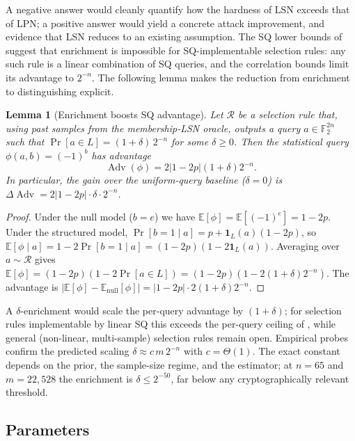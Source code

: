 \documentclass[11pt,a4paper]{article}
\theoremstyle{plain}
\newtheorem{lemma}[theorem]{Lemma}
\theoremstyle{definition}
\newcommand{\F}{\mathbb{F}}
\newcommand{\E}{\mathbb{E}}
\begin{document}
A negative answer would cleanly quantify how the hardness of LSN exceeds that of LPN; a positive answer would yield a concrete attack improvement, and evidence that LSN reduces to an existing assumption.  The SQ lower bounds of  suggest that enrichment is impossible for SQ-implementable selection rules: any such rule is a linear combination of SQ queries, and the correlation bounds limit its advantage to $2^{-n}$. The following lemma makes the reduction from enrichment to distinguishing explicit.

\begin{lemma}[Enrichment boosts SQ advantage]
\label{lem:enrichment-sq}
Let $\mathcal{R}$ be a selection rule that, using past samples from the membership-LSN oracle, outputs a query $a \in \F_2^{2n}$ such that $\Pr[a \in L] = (1+\delta)\,2^{-n}$ for some $\delta \ge 0$. Then the statistical query $\phi(a,b) = (-1)^b$ has advantage
\[
  \operatorname{Adv}(\phi) = 2|1-2p|(1+\delta)2^{-n}.
\]
In particular, the gain over the uniform-query baseline ($\delta=0$) is $\Delta\operatorname{Adv} = 2|1-2p|\cdot\delta\cdot 2^{-n}$.
\end{lemma}

\begin{proof}
Under the null model ($b=e$) we have $\E[\phi] = \E[(-1)^e] = 1-2p$. Under the structured model, $\Pr[b=1 \mid a] = p + \mathbf{1}_L(a)(1-2p)$, so $\E[\phi \mid a] = 1-2\Pr[b=1 \mid a] = (1-2p)(1-2\mathbf{1}_L(a))$. Averaging over $a \sim \mathcal{R}$ gives $\E[\phi] = (1-2p)(1-2\Pr[a \in L]) = (1-2p)(1-2(1+\delta)2^{-n})$. The advantage is $|\E[\phi]-\E_{\text{null}}[\phi]| = |1-2p| \cdot 2(1+\delta)2^{-n}$.
\end{proof}

A $\delta$-enrichment would scale the per-query advantage by $(1+\delta)$; for selection rules implementable by linear SQ this exceeds the per-query ceiling of , while general (non-linear, multi-sample) selection rules remain open.  Empirical probes confirm the predicted scaling $\delta \approx c\,m\,2^{-n}$ with $c=\Theta(1)$.  The exact constant depends on the prior, the sample-size regime, and the estimator; at $n=65$ and $m=22{,}528$ the enrichment is $\delta \le 2^{-50}$, far below any cryptographically relevant threshold.

\subsection{Parameters}
\label{subsec:parameters}
\end{document}

